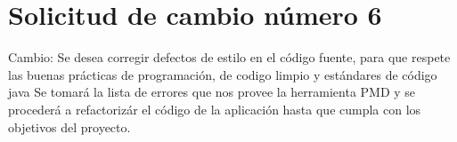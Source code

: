 \section{Solicitud de cambio número 6}
Cambio: Se desea corregir defectos de estilo en el código fuente, para que respete las buenas prácticas de programación, de codigo limpio y estándares de código java
Se tomará la lista de errores que nos provee la herramienta PMD y se procederá a refactorizár el código de la aplicación hasta que cumpla con los objetivos del proyecto.
